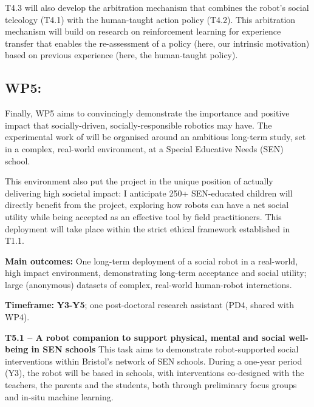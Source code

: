 T4.3 will also develop the arbitration mechanism that combines the robot's
social teleology (T4.1) with the human-taught action policy (T4.2). This
arbitration mechanism will build on research on reinforcement learning for
experience transfer that enables the re-assessment of
a policy (here, our intrinsic motivation) based on previous experience (here,
the human-taught policy).

\subsection{WP5: \textbf{\wpFive}}

Finally, WP5 aims to convincingly demonstrate the importance and positive
impact that socially-driven, socially-responsible robotics may have. The
experimental work of \project will be organised around an ambitious long-term
study, set in a complex, real-world environment, at a Special Educative
Needs (SEN) school.

This environment also put the project in the unique position of actually
delivering high societal impact: I anticipate 250+ SEN-educated children will
directly benefit from the project, exploring how robots can have a net social
utility while being accepted as an effective tool by field practitioners. This
deployment will take place within the strict ethical framework established in
T1.1.

\begin{oframed}

    \textbf{Main outcomes:} One long-term deployment of a social robot in a
    real-world, high impact environment, demonstrating long-term acceptance and
    social utility; large (anonymous) datasets of complex, real-world
    human-robot interactions.

    \textbf{Timeframe:} \textbf{Y3-Y5}; one post-doctoral research assistant (PD4, shared with WP4).

\end{oframed}

\textbf{T5.1 -- A robot companion to support physical, mental and social
well-being in SEN schools} This task aims to demonstrate robot-supported
social interventions within Bristol's network of SEN schools.  During a one-year
period (Y3), the robot will be based in schools, with interventions co-designed
with the teachers, the parents and the students, both through preliminary
focus groups and in-situ machine learning.

